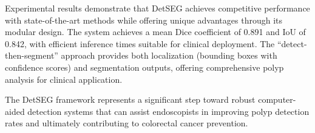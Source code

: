 \documentclass[conference]{IEEEtran}
\begin{document}
Experimental results demonstrate that DetSEG achieves competitive performance with state-of-the-art methods while offering unique advantages through its modular design. The system achieves a mean Dice coefficient of 0.891 and IoU of 0.842, with efficient inference times suitable for clinical deployment. The ``detect-then-segment'' approach provides both localization (bounding boxes with confidence scores) and segmentation outputs, offering comprehensive polyp analysis for clinical application.

The DetSEG framework represents a significant step toward robust computer-aided detection systems that can assist endoscopists in improving polyp detection rates and ultimately contributing to colorectal cancer prevention.

\end{document}
